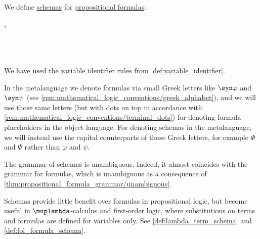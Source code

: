 \begin{definition}\label{def:propositional_formula_schema}\mimprovised
  We define \hyperref[con:schemas_and_instances]{schemas} for \hyperref[def:propositional_formula]{propositional formulas}:
  \begin{bnf*}
     {}, \\
          {\bnftsq{\( \syntop \)} \bnfor \bnftsq{\( \synbot \)} \bnfor} \\
     \\
     \\
  \end{bnf*}

  We have used the variable identifier rules from \cref{def:variable_identifier}.
\end{definition}
\begin{comments}
  \item In the metalanguage we denote formulas via small Greek letters like \( \syn\varphi \) and \( \syn\psi \) (see \cref{rem:mathematical_logic_conventions/greek_alphabet}), and we will use those same letters (but with dots on top in accordance with \cref{rem:mathematical_logic_conventions/terminal_dots}) for denoting formula placeholders in the object language. For denoting schemas in the metalanguage, we will instead use the capital counterparts of those Greek letters, for example \( \Phi \) and \( \Psi \) rather than \( \varphi \) and \( \psi \).

  \item The grammar of schemas is unambiguous. Indeed, it almost coincides with the grammar for formulas, which is unambiguous as a consequence of \cref{thm:propositional_formula_grammar/unambiguous}.

  \item Schemas provide little benefit over formulas in propositional logic, but become useful in \( \muplambda \)-calculus and first-order logic, where substitutions on terms and formulas are defined for variables only. See \cref{def:lambda_term_schema} and \cref{def:fol_formula_schema}.
\end{comments}

